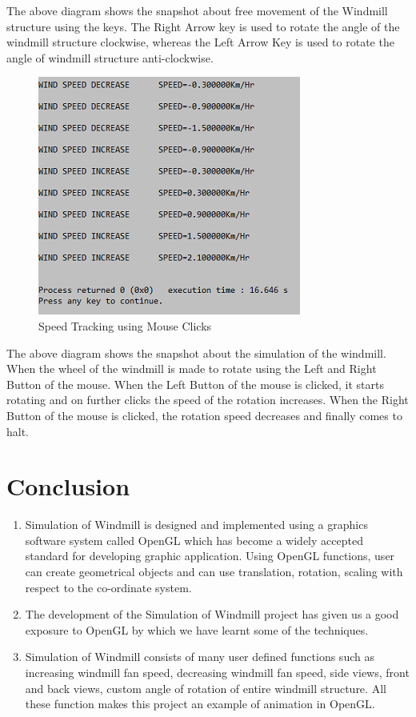 \documentclass[fontsize=12pt]{article}
\begin{document}
The above diagram shows the snapshot about free movement of the Windmill structure using the keys. The Right Arrow key is used to rotate the angle of the windmill structure clockwise, whereas the Left Arrow Key is used to rotate the angle of windmill structure anti-clockwise.\\

\begin{figure}[h]
	\centering
  	\includegraphics{F6.PNG}
  	\caption{Speed Tracking using Mouse Clicks}
  	\label{fig:Custom}
\end{figure}

The above diagram shows the snapshot about the simulation of the windmill. When the wheel of the windmill is made to rotate using the Left and Right Button of the mouse. When the Left Button of the mouse is clicked, it starts rotating and on further clicks the speed of the rotation increases. When the Right Button of the mouse is clicked, the rotation speed decreases and finally comes to halt.


\section{Conclusion}
\begin{enumerate}
\item Simulation of Windmill is designed and implemented using a graphics software system called OpenGL which has become a widely accepted standard for developing graphic application. Using OpenGL functions, user can create geometrical objects and can use translation, rotation, scaling with respect to the co-ordinate system.
\item The development of the Simulation of Windmill project has given us a good exposure to OpenGL by which we have learnt some of the techniques.
\item Simulation of Windmill consists of many user defined functions such as increasing windmill fan speed, decreasing windmill fan speed, side views, front and back views, custom angle of rotation of entire windmill structure. All these function makes this project an example of animation in OpenGL.
\end{enumerate}
\end{document}
